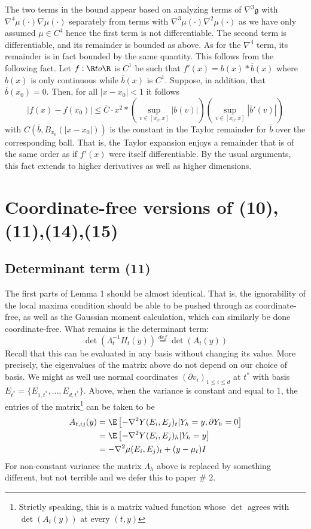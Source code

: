 \documentclass{article}
\begin{document}
The two terms in the bound appear based on analyzing terms of
$\nabla^3 \mathfrak{g}$ with $\nabla^4 \mu(\cdot) \nabla \mu(\cdot)$
separately from terms with $\nabla^3 \mu(\cdot) \nabla^2 \mu(\cdot)$
as we have only assumed $\mu \in C^{4}$ hence the first term is not
differentiable. The second term is differentiable, and its remainder
is bounded as above.  As for the $\nabla^4$ term, its remainder is in
fact bounded by the same quantity. This follows from the following
fact. Let $f: \R to \R$ is $C^1$ be such that $f'(x) = b(x) *
\bar{b}(x)$ where $b(x)$ is only continuous while $\bar{b}(x)$ is
$C^{1}$. Suppose, in addition, that $\bar{b}(x_0)=0$. Then, for
  all $|x-x_0|<1$ it follows
  $$
  \left|  f(x) - f(x_0) \right| \leq  \bar{C} \cdot x^2 * \left(\sup_{v \in [x_0,x]} | b(v)| \right)
  \left(\sup_{v \in [x_0, x]} |\bar{b}'(v)| \right)
  $$
with $C(\bar{b}, B_{x_0}(|x-x_0|))$ is the constant in the Taylor remainder for $\bar{b}$ over the corresponding ball.
That is, the Taylor expansion enjoys a remainder that is of the same order as if $f'(x)$ were itself differentiable.
By the usual arguments, this fact extends to higher derivatives as well as higher dimensions.


\section{Coordinate-free versions of (10),(11),(14),(15)}

\subsection{Determinant term (11)}

The first parts of Lemma 1 should be almost identical. That is, the ignorability
of the local maxima condition should be able to be pushed through as coordinate-free,
as well as the Gaussian moment calculation, which can similarly be done coordinate-free. What remains is the determinant term:
$$
\det(\Lambda_t^{-1} H_t(y)) \overset{def}{=} \det(A_t(y))
$$
Recall that this can be evaluated in any basis without changing its value. More precisely, the eigenvalues
of the matrix above do not depend on our choice of basis.
We might as well use normal coordinates $(\partial v_i)_{1 \leq i \leq d}$ at $t^*$ with basis $E_{t^*}=\{E_{1,t^*}, \dots, E_{d,t^*}\}$.
Above, when the variance is constant and equal to 1, the entries of the matrix\footnote{Strictly speaking, this is a matrix valued function whose $\det$ agrees with $\det(A_t(y))$ at every $(t,y)$} can be taken to be
$$
\begin{aligned}
A_{t,ij}(y) &= \E \left[-\nabla^2 Y(E_i, E_j)_t | Y_h=y, \partial Y_h=0\right] \\
&= \E \left[-\nabla^2 Y(E_i, E_j)_h | Y_h=y\right] \\
&= - \nabla^2 \mu(E_i, E_j)_t + (y - \mu_t) I \\
\end{aligned}
$$
For non-constant variance the matrix $\Lambda_h$ above is replaced by something different, but not terrible and we defer this to paper \# 2.
\end{document}
